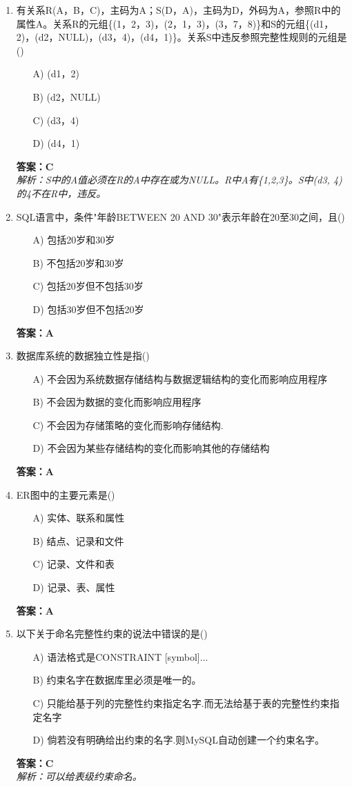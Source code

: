 \documentclass[a4paper,12pt]{article}
\begin{document}
\begin{enumerate}[label=\arabic*.]
\item 有关系R(A，B，C)，主码为A；S(D，A)，主码为D，外码为A，参照R中的属性A。关系R的元组\{(1，2，3)，(2，1，3)，(3，7，8)\}和S的元组\{(d1，2)，(d2，NULL)，(d3，4)，(d4，1)\}。关系S中违反参照完整性规则的元组是()
\begin{itemize}
    \item[A)] (d1，2)
    \item[B)] (d2，NULL)
    \item[C)] (d3，4)
    \item[D)] (d4，1)
\end{itemize}
\textbf{答案：C} \\
\textit{解析：S中的A值必须在R的A中存在或为NULL。R中A有\{1,2,3\}。S中(d3, 4)的4不在R中，违反。}

\item SQL语言中，条件"年龄BETWEEN 20 AND 30"表示年龄在20至30之间，且()
\begin{itemize}
    \item[A)] 包括20岁和30岁
    \item[B)] 不包括20岁和30岁
    \item[C)] 包括20岁但不包括30岁
    \item[D)] 包括30岁但不包括20岁
\end{itemize}
\textbf{答案：A}

\item 数据库系统的数据独立性是指()
\begin{itemize}
    \item[A)] 不会因为系统数据存储结构与数据逻辑结构的变化而影响应用程序
    \item[B)] 不会因为数据的变化而影响应用程序
    \item[C)] 不会因为存储策略的变化而影响存储结构.
    \item[D)] 不会因为某些存储结构的变化而影响其他的存储结构
\end{itemize}
\textbf{答案：A}

\item ER图中的主要元素是()
\begin{itemize}
    \item[A)] 实体、联系和属性
    \item[B)] 结点、记录和文件
    \item[C)] 记录、文件和表
    \item[D)] 记录、表、属性
\end{itemize}
\textbf{答案：A}

\item 以下关于命名完整性约束的说法中错误的是()
\begin{itemize}
    \item[A)] 语法格式是CONSTRAINT [symbol]...
    \item[B)] 约束名字在数据库里必须是唯一的。
    \item[C)] 只能给基于列的完整性约束指定名字.而无法给基于表的完整性约束指定名字
    \item[D)] 倘若没有明确给出约束的名字.则MySQL自动创建一个约束名字。
\end{itemize}
\textbf{答案：C} \\
\textit{解析：可以给表级约束命名。}


\end{enumerate}
\end{document}

